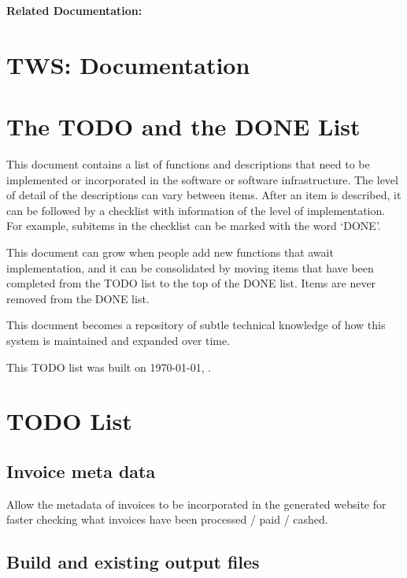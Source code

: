 \documentclass[12pt]{article}
\begin{document}
{\bf Related Documentation:}

\section*{TWS: Documentation}

\section{The TODO and the DONE List}

This document contains a list of functions and descriptions that need
to be implemented or incorporated in the software or software
infrastructure.  The level of detail of the descriptions can vary
between items.  After an item is described, it can be followed by a
checklist with information of the level of implementation.  For
example, subitems in the checklist can be marked with the word `DONE'.

This document can grow when people add new functions that await
implementation, and it can be consolidated by moving items that have
been completed from the TODO list to the top of the DONE list.  Items
are never removed from the DONE list.

This document becomes a repository of subtle technical knowledge of
how this system is maintained and expanded over time.

This TODO list was built on \today, \thistime.


\section{TODO List}

\subsection{Invoice meta data}

Allow the metadata of invoices to be incorporated in the generated
website for faster checking what invoices have been processed / paid /
cashed.


\subsection{Build and existing output files}
\end{document}
